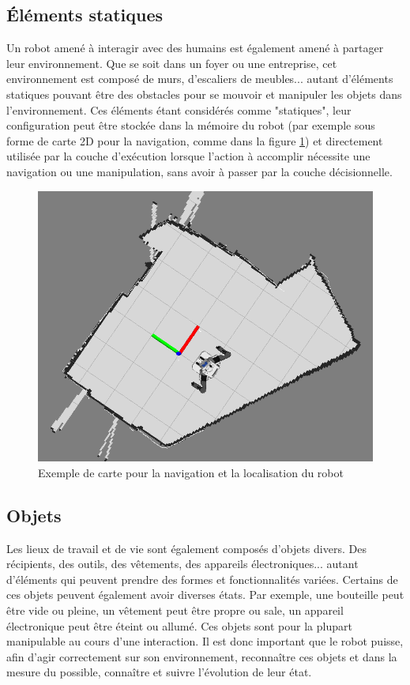 \documentclass[a4paper,11pt,twoside]{StyleThese}
\begin{document}
\subsection{Éléments statiques}
Un robot amené à interagir avec des humains est également amené à partager leur environnement. Que se soit dans un foyer ou une entreprise, cet environnement est composé de murs, d'escaliers de meubles... autant d'éléments statiques pouvant être des obstacles pour se mouvoir et manipuler les objets dans l'environnement. Ces éléments étant considérés comme "statiques", leur configuration peut être stockée dans la mémoire du robot (par exemple sous forme de carte 2D pour la navigation, comme dans la figure \ref{fig:map}) et directement utilisée par la couche d'exécution lorsque l'action à accomplir nécessite une navigation ou une manipulation, sans avoir à passer par la couche décisionnelle.

\begin{figure}[ht!]
 \centering
  \includegraphics[width=0.59\linewidth]{./img/Map2d.png} 
  \caption {Exemple de carte pour la navigation et la localisation du robot}
  \label{fig:map}
\end{figure}

\subsection{Objets}
Les lieux de travail et de vie sont également composés d'objets divers. Des récipients, des outils, des vêtements, des appareils électroniques... autant d'éléments qui peuvent prendre des formes et fonctionnalités variées.
Certains de ces objets peuvent également avoir diverses états. Par exemple, une bouteille peut être vide ou pleine, un vêtement peut être propre ou sale, un appareil électronique peut être éteint ou allumé.
Ces objets sont pour la plupart manipulable au cours d'une interaction. Il est donc important que le robot puisse, afin d'agir correctement sur son environnement, reconnaître ces objets et dans la mesure du possible, connaître et suivre l'évolution de leur état.
\end{document}
